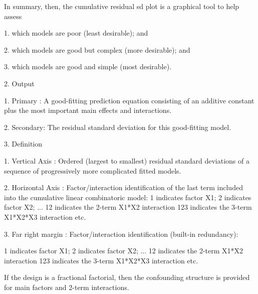 In summary, then, the cumulative residual sd plot is a
graphical tool to help assess

   1. which models are poor (least desirable); and

   2. which models are good but complex (more desirable); and

   3. which models are good and simple (most desirable).

2. Output

   1. Primary  : A good-fitting prediction
                 equation consisting of an
                 additive constant plus the most
                 important main effects and
                 interactions.

   2. Secondary: The residual standard deviation
                 for this good-fitting model.

3. Definition

   1. Vertical Axis    : Ordered (largest to
                         smallest) residual
                         standard deviations of a
                         sequence of progressively
                         more complicated fitted
                         models.


   2. Horizontal Axis  : Factor/interaction
                         identification of the last
                         term included into the cumulative
                         linear combinatoric model:
                             1 indicates factor X1;
                             2 indicates factor X2;
                             ...
                             12 indicates the 2-term
                                X1*X2 interaction
                             123 indicates the 3-term
                                X1*X2*X3 interaction
                             etc.

   3. Far right margin : Factor/interaction
                         identification (built-in
                         redundancy):

                             1 indicates factor X1;
                             2 indicates factor X2;
                             ...
                             12 indicates the 2-term
                                X1*X2 interaction
                             123 indicates the 3-term
                                X1*X2*X3 interaction
                             etc.

                         If the design is a
                         fractional factorial,
                         then the confounding
                         structure is provided for
                         main factors and 2-term
                         interactions.

